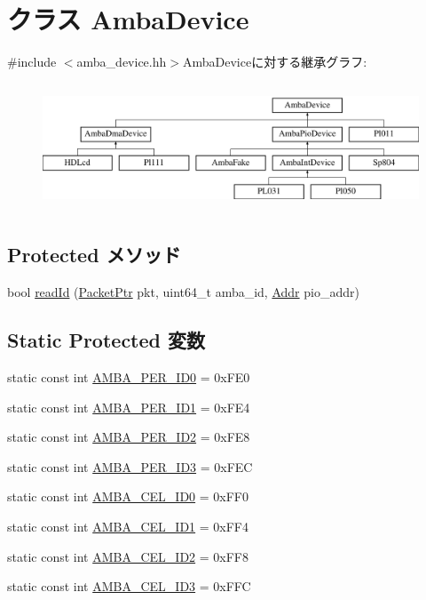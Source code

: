 \hypertarget{classAmbaDevice}{
\section{クラス AmbaDevice}
\label{classAmbaDevice}
}


{\ttfamily \#include $<$amba\_\-device.hh$>$}AmbaDeviceに対する継承グラフ:\begin{figure}[H]
\begin{center}
\leavevmode
\includegraphics[height=3.82906cm]{classAmbaDevice}
\end{center}
\end{figure}
\subsection*{Protected メソッド}
\begin{DoxyCompactItemize}
\item 
bool \hyperlink{classAmbaDevice_a071939342677d0c85870b8f65d8f7639}{readId} (\hyperlink{classPacket}{PacketPtr} pkt, uint64\_\-t amba\_\-id, \hyperlink{base_2types_8hh_af1bb03d6a4ee096394a6749f0a169232}{Addr} pio\_\-addr)
\end{DoxyCompactItemize}
\subsection*{Static Protected 変数}
\begin{DoxyCompactItemize}
\item 
static const int \hyperlink{classAmbaDevice_a2ef71e98174278bd1964330103e718fd}{AMBA\_\-PER\_\-ID0} = 0xFE0
\item 
static const int \hyperlink{classAmbaDevice_a0b1e80bd6a1a75a77ce15e635f4ce202}{AMBA\_\-PER\_\-ID1} = 0xFE4
\item 
static const int \hyperlink{classAmbaDevice_a8a256ec5e875dd4a35b512e1e8b543da}{AMBA\_\-PER\_\-ID2} = 0xFE8
\item 
static const int \hyperlink{classAmbaDevice_a8f88e72f8e921732c961755c7e97c852}{AMBA\_\-PER\_\-ID3} = 0xFEC
\item 
static const int \hyperlink{classAmbaDevice_a749a0c336bf3249b928dd9b6bb8cd75f}{AMBA\_\-CEL\_\-ID0} = 0xFF0
\item 
static const int \hyperlink{classAmbaDevice_a9e920cb98d58a4845d818c7f7cfd7370}{AMBA\_\-CEL\_\-ID1} = 0xFF4
\item 
static const int \hyperlink{classAmbaDevice_ae1396143a7fd241c2758b69cbae097e3}{AMBA\_\-CEL\_\-ID2} = 0xFF8
\item 
static const int \hyperlink{classAmbaDevice_aed8b9f80686a3bd7cdafc05556bb3bbc}{AMBA\_\-CEL\_\-ID3} = 0xFFC
\end{DoxyCompactItemize}


